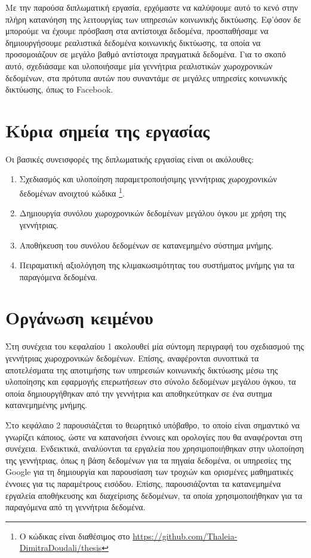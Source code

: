 Με την παρούσα διπλωματική εργασία, ερχόμαστε να καλύψουμε αυτό το κενό στην πλήρη κατανόηση της λειτουργίας των υπηρεσιών κοινωνικής δικτύωσης. 
Εφ'όσον δε μπορούμε να έχουμε πρόσβαση στα αντίστοιχα δεδομένα, προσπαθήσαμε να δημιουργήσουμε ρεαλιστικά \linebreak 
δεδομένα κοινωνικής δικτύωσης, τα οποία να προσομοιάζουν 
σε μεγάλο βαθμό αντίστοιχα \linebreak 
πραγματικά δεδομένα. Για το σκοπό αυτό, σχεδιάσαμε και υλοποιήσαμε μία γεννήτρια ρεαλιστικών χωροχρονικών δεδομένων, στα πρότυπα 
αυτών που συναντάμε σε μεγάλες υπηρεσίες κοινωνικής δικτύωσης, όπως το Facebook. 

\newpage

\section{Κύρια σημεία της εργασίας}

Οι βασικές συνεισφορές της διπλωματικής εργασίας είναι οι ακόλουθες:

\begin{enumerate}
 \item Σχεδιασμός και υλοποίηση παραμετροποιήσιμης γεννήτριας χωροχρονικών δεδομένων \linebreak ανοιχτού κώδικα \footnote{Ο κώδικας είναι διαθέσιμος στο 
 \url{https://github.com/Thaleia-DimitraDoudali/thesis}}.
 \item Δημιουργία συνόλου χωροχρονικών δεδομένων μεγάλου όγκου με χρήση της γεννήτριας.
 \item Αποθήκευση του συνόλου δεδομένων σε κατανεμημένο σύστημα μνήμης.
 \item Πειραματική αξιολόγηση της κλιμακωσιμότητας του συστήματος μνήμης για τα παραγόμενα δεδομένα.
\end{enumerate}

\section{Οργάνωση κειμένου}

Στη συνέχεια του κεφαλαίου 1 ακολουθεί μία σύντομη περιγραφή του σχεδιασμού της γεννήτριας χωροχρονικών δεδομένων. Επίσης, αναφέρονται συνοπτικά τα 
αποτελέσματα της αποτιμήσης των υπηρεσιών κοινωνικής δικτύωσης μέσω της υλοποίησης και εφαρμογής επερωτήσεων στο σύνολο δεδομένων μεγάλου όγκου, 
τα οποία δημιουργήθηκαν από την γεννήτρια και αποθηκεύτηκαν σε ένα συτημα κατανεμημένης μνήμης.

Στο κεφάλαιο 2 παρουσιάζεται το θεωρητικό υπόβαθρο, το οποίο είναι σημαντικό να γνωρίζει κάποιος, ώστε να κατανοήσει έννοιες και ορολογίες που θα αναφέρονται 
στη συνέχεια. Ενδεικτικά, αναλύονται τα εργαλεία που χρησιμοποιήθηκαν στην υλοποίηση της γεννήτριας, όπως η βάση \linebreak δεδομένων για τα πηγαία δεδομένα, 
οι υπηρεσίες της Google για τη δημιουργία και παρουσίαση των τροχιών και ορισμένες μαθηματικές έννοιες για τις παραμέτρους εισόδου. Επίσης, 
παρουσιάζονται τα κατανεμημένα εργαλεία αποθήκευσης και διαχείρισης δεδομένων, τα οποία χρησιμοποιήθηκαν για τα παραγόμενα από τη γεννήτρια δεδομένα. 

